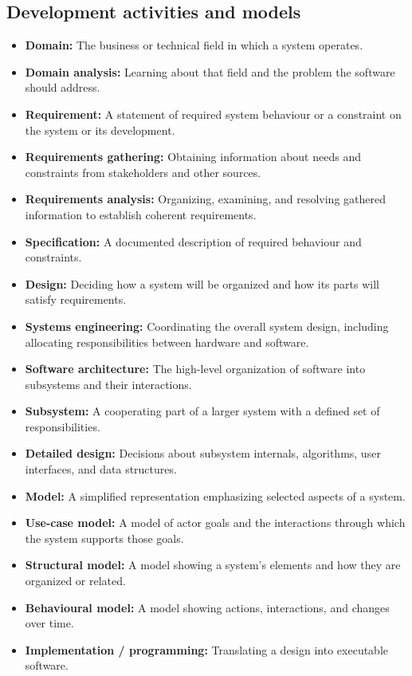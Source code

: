 \documentclass[11pt]{article}
\newenvironment{DottedList}{%
  \begin{itemize}[leftmargin=2em, itemsep=0.35em, topsep=0.35em, label=\textbullet]
}{%
  \end{itemize}
}
\begin{document}
\subsection*{Development activities and models}
\begin{DottedList}
  \item \textbf{Domain:} The business or technical field in which a system operates.
  \item \textbf{Domain analysis:} Learning about that field and the problem the software should address.
  \item \textbf{Requirement:} A statement of required system behaviour or a constraint on the system or its development.
  \item \textbf{Requirements gathering:} Obtaining information about needs and constraints from stakeholders and other sources.
  \item \textbf{Requirements analysis:} Organizing, examining, and resolving gathered information to establish coherent requirements.
  \item \textbf{Specification:} A documented description of required behaviour and constraints.
  \item \textbf{Design:} Deciding how a system will be organized and how its parts will satisfy requirements.
  \item \textbf{Systems engineering:} Coordinating the overall system design, including allocating responsibilities between hardware and software.
  \item \textbf{Software architecture:} The high-level organization of software into subsystems and their interactions.
  \item \textbf{Subsystem:} A cooperating part of a larger system with a defined set of responsibilities.
  \item \textbf{Detailed design:} Decisions about subsystem internals, algorithms, user interfaces, and data structures.
  \item \textbf{Model:} A simplified representation emphasizing selected aspects of a system.
  \item \textbf{Use-case model:} A model of actor goals and the interactions through which the system supports those goals.
  \item \textbf{Structural model:} A model showing a system's elements and how they are organized or related.
  \item \textbf{Behavioural model:} A model showing actions, interactions, and changes over time.
  \item \textbf{Implementation / programming:} Translating a design into executable software.

\end{DottedList}
\end{document}
